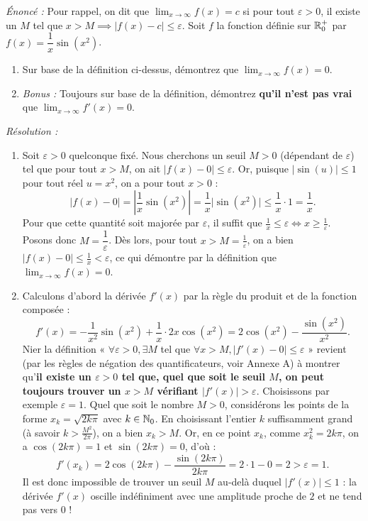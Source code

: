 \begin{exemple}
\emph{Énoncé :} Pour rappel, on dit que $\lim_{x \to \infty} f(x) = c$ si pour tout $\varepsilon > 0$, il existe un $M$ tel que $x > M \implies |f(x) - c| \le \varepsilon$. Soit $f$ la fonction définie sur $\mathbb{R}_0^+$ par $f(x) = \dfrac{1}{x}\sin(x^2)$.
\begin{enumerate}[label=(\roman*)]
    \item Sur base de la définition ci-dessus, démontrez que $\lim_{x \to \infty} f(x) = 0$.
    \item \emph{Bonus :} Toujours sur base de la définition, démontrez \textbf{qu'il n'est pas vrai} que $\lim_{x \to \infty} f'(x) = 0$.
\end{enumerate}

\emph{Résolution :}
\begin{enumerate}[label=(\roman*)]
    \item Soit $\varepsilon > 0$ quelconque fixé. Nous cherchons un seuil $M > 0$ (dépendant de $\varepsilon$) tel que pour tout $x > M$, on ait $|f(x) - 0| \le \varepsilon$. Or, puisque $|\sin(u)| \le 1$ pour tout réel $u = x^2$, on a pour tout $x > 0$ :
    \[
        \bigl|f(x) - 0\bigr| = \left|\frac{1}{x}\sin(x^2)\right| = \frac{1}{x}\bigl|\sin(x^2)\bigr| \le \frac{1}{x} \cdot 1 = \frac{1}{x}.
    \]
    Pour que cette quantité soit majorée par $\varepsilon$, il suffit que $\frac{1}{x} \le \varepsilon \iff x \ge \frac{1}{\varepsilon}$. Posons donc $\boxed{M = \dfrac{1}{\varepsilon}}$. Dès lors, pour tout $x > M = \frac{1}{\varepsilon}$, on a bien $|f(x) - 0| \le \frac{1}{x} < \varepsilon$, ce qui démontre par la définition que $\lim_{x \to \infty} f(x) = 0$.
    \item Calculons d'abord la dérivée $f'(x)$ par la règle du produit et de la fonction composée :
    \[
        f'(x) = -\frac{1}{x^2}\sin(x^2) + \frac{1}{x}\cdot 2x\cos(x^2) = 2\cos(x^2) - \frac{\sin(x^2)}{x^2}.
    \]
    Nier la définition « $\forall \varepsilon > 0, \exists M$ tel que $\forall x > M, |f'(x) - 0| \le \varepsilon$ » revient (par les règles de négation des quantificateurs, voir Annexe A) à montrer qu'\textbf{il existe un $\varepsilon > 0$ tel que, quel que soit le seuil $M$, on peut toujours trouver un $x > M$ vérifiant $|f'(x)| > \varepsilon$}.
    Choisissons par exemple $\boxed{\varepsilon = 1}$. Quel que soit le nombre $M > 0$, considérons les points de la forme $x_k = \sqrt{2k\pi}$ avec $k \in \mathbb{N}_0$. En choisissant l'entier $k$ suffisamment grand (à savoir $k > \frac{M^2}{2\pi}$), on a bien $x_k > M$. Or, en ce point $x_k$, comme $x_k^2 = 2k\pi$, on a $\cos(2k\pi) = 1$ et $\sin(2k\pi) = 0$, d'où :
    \[
        f'(x_k) = 2\cos(2k\pi) - \frac{\sin(2k\pi)}{2k\pi} = 2 \cdot 1 - 0 = 2 > \varepsilon = 1.
    \]
    Il est donc impossible de trouver un seuil $M$ au-delà duquel $|f'(x)| \le 1$ : la dérivée $f'(x)$ oscille indéfiniment avec une amplitude proche de $2$ et ne tend pas vers $0$ !
\end{enumerate}
\end{exemple}

